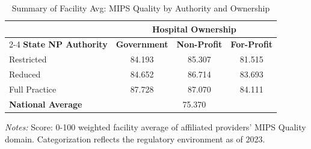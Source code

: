 \begin{table}[htbp]
    \centering
    \caption{Summary of Facility Avg: MIPS Quality by Authority and Ownership}
    \label{tab:mips_quality_score_own}
    \vspace{0.2cm}
    \begin{tabular}{lccc}
        \toprule
        & \multicolumn{3}{c}{\textbf{Hospital Ownership}} \\
        \cmidrule(lr){2-4}
        \textbf{State NP Authority} & \textbf{Government} & \textbf{Non-Profit} & \textbf{For-Profit} \\
        \midrule
        Restricted & 84.193 & 85.307 & 81.515 \\
        Reduced & 84.652 & 86.714 & 83.693 \\
        Full Practice & 87.728 & 87.070 & 84.111 \\
        \midrule
        \textbf{National Average} & \multicolumn{3}{c}{75.370} \\
        \bottomrule
    \end{tabular}
    \vspace{0.1cm}
    \begin{minipage}{0.85\textwidth}
        \footnotesize \textit{Notes:} Score: 0-100 weighted facility average of affiliated providers' MIPS Quality domain. Categorization reflects the regulatory environment as of 2023.
    \end{minipage}
\end{table}